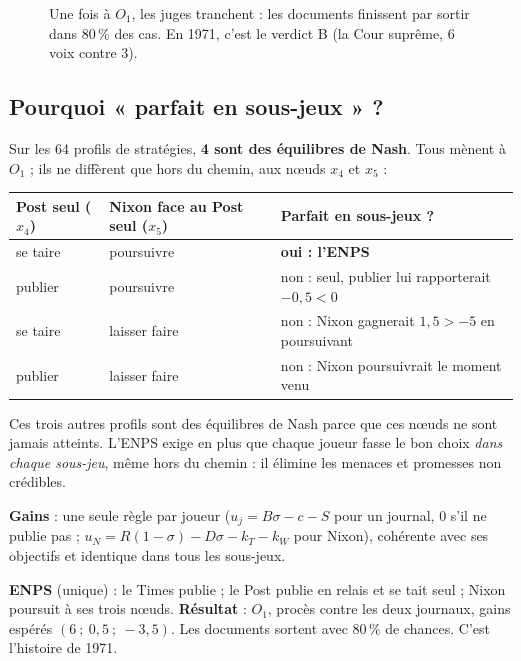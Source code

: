 \documentclass[11pt,a4paper]{article}
\theoremstyle{definition}
\begin{document}
\begin{figure}[H]
\centering
{}
\caption{Une fois à $O_1$, les juges tranchent : les documents finissent par sortir dans $80\,\%$ des cas. En 1971, c'est le verdict B (la Cour suprême, 6 voix contre 3).}
\end{figure}

\subsection{Pourquoi « parfait en sous-jeux » ?}
Sur les 64 profils de stratégies, \textbf{4 sont des équilibres de Nash}. Tous mènent à $O_1$ ; ils ne diffèrent que hors du chemin, aux nœuds $x_4$ et $x_5$ :
\begin{center}
\small
\begin{tabular}{@{}lll@{}}
\toprule
Post seul ($x_4$) & Nixon face au Post seul ($x_5$) & Parfait en sous-jeux ? \\
\midrule
se taire & poursuivre & \textbf{oui : l'ENPS} \\
publier & poursuivre & non : seul, publier lui rapporterait $-0{,}5<0$ \\
se taire & laisser faire & non : Nixon gagnerait $1{,}5>-5$ en poursuivant \\
publier & laisser faire & non : Nixon poursuivrait le moment venu \\
\bottomrule
\end{tabular}
\end{center}
Ces trois autres profils sont des équilibres de Nash parce que ces nœuds ne sont jamais atteints. L'ENPS exige en plus que chaque joueur fasse le bon choix \emph{dans chaque sous-jeu}, même hors du chemin : il élimine les menaces et promesses non crédibles.

\begin{reponse}
\textbf{Gains} : une seule règle par joueur ($u_j=B\sigma-c-S$ pour un journal, $0$ s'il ne publie pas ; $u_N=R(1-\sigma)-D\sigma-k_T-k_W$ pour Nixon), cohérente avec ses objectifs et identique dans tous les sous-jeux.

\textbf{ENPS} (unique) : le Times publie ; le Post publie en relais et se tait seul ; Nixon poursuit à ses trois nœuds. \textbf{Résultat} : $O_1$, procès contre les deux journaux, gains espérés $(6\ ;\ 0{,}5\ ;\ -3{,}5)$. Les documents sortent avec $80\,\%$ de chances. C'est l'histoire de 1971.
\end{reponse}
\end{document}
